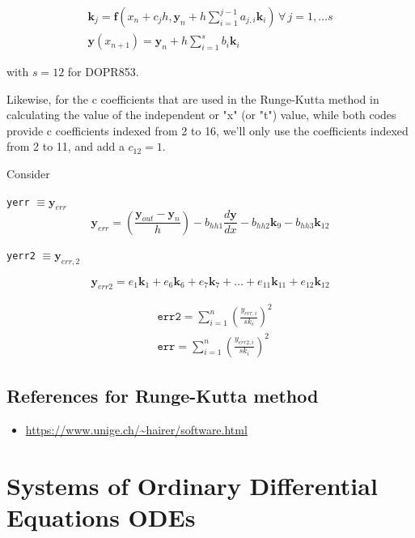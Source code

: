 \documentclass[10pt]{amsart}
\begin{document}
\begin{multicols*}{2}
\begin{equation}
\begin{gathered}
\mathbf{k}_j = \mathbf{f}(x_n + c_j h, \mathbf{y}_n + h \sum_{i=1}^{j-1} a_{j, i} \mathbf{k}_i ) \, \forall \, j = 1, \dots s \\
\mathbf{y}(x_{n+1}) = \mathbf{y}_n + h \sum_{i=1}^s b_i \mathbf{k}_i
\end{gathered}
\end{equation}

with $s=12$ for DOPR853.

Likewise, for the c coefficients that are used in the Runge-Kutta method in calculating the value of the independent or "x" (or "t") value, while both codes provide c coefficients indexed from 2 to 16, we'll only use the coefficients indexed from 2 to 11, and add a $c_{12} = 1$.

Consider

\texttt{yerr} $\equiv \mathbf{y}_{err}$
\[
\mathbf{y}_{err} = \left( \frac{\mathbf{y}_{out} - \mathbf{y}_n }{ h} \right) - b_{hh1} \frac{d\mathbf{y}}{dx} - b_{hh2} \mathbf{k}_9 - b_{hh3} \mathbf{k}_{12}
\]

\texttt{yerr2} $\equiv \mathbf{y}_{err,2}$

\[
\mathbf{y}_{err2} = e_1 \mathbf{k}_1 + e_6 \mathbf{k}_6 + e_7 \mathbf{k}_7 + \dots + e_{11}\mathbf{k}_{11} + e_{12} \mathbf{k}_{12}
\]

\[
\begin{aligned}
& \texttt{err2} = \sum_{i=1}^n \left( \frac{y_{err, i}}{sk_i }\right)^2 \\
& \texttt{err} = \sum_{i=1}^n \left( \frac{ y_{err2, i} }{sk_i} \right)^2
\end{aligned}
\]

\subsection{References for Runge-Kutta method}

\begin{itemize}
\item \url{https://www.unige.ch/~hairer/software.html}
\end{itemize}

\section{Systems of Ordinary Differential Equations ODEs}


\end{multicols*}
\end{document}
